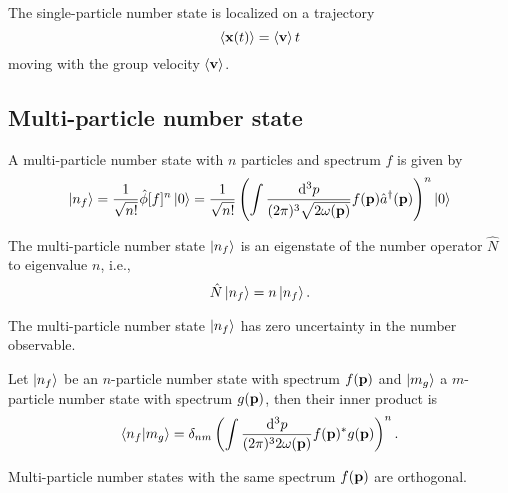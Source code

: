 \begin{lemma}
	The single-particle number state is localized on a trajectory
	\begin{equation}
		\expval{\vb{x}(t)}
		=
		\expval{\vb{v}}t
	\end{equation}
	moving with the group velocity $\expval{\vb{v}}$.
\end{lemma}

\subsection{Multi-particle number state}

\begin{definition}
	A multi-particle number state with $n$ particles and spectrum $f$ is given by
	\begin{equation}
		\ket{n_f}
		=
		\frac{1}{\sqrt{n!}}
		\hat\phi[f]^n
		\ket{0}
		=
		\frac{1}{\sqrt{n!}}
		\left(
			\int\frac{\dd[3]{p}}{(2\pi)^3\sqrt{2\omega(\vb{p})}}
			f(\vb{p})
			\hat{a}^\dagger(\vb{p})
		\right)^n
		\ket{0}
	\end{equation}
\end{definition}
\begin{theorem}
	The multi-particle number state $\ket{n_f}$ is an eigenstate of the number operator $\hat{N}$ to eigenvalue $n$, i.e.,
	\begin{equation}
		\hat{N}
		\ket{n_f}
		=
		n
		\ket{n_f}
		.
	\end{equation}
\end{theorem}
\begin{corollary}
	The multi-particle number state $\ket{n_f}$ has zero uncertainty in the number observable.
\end{corollary}
\begin{theorem}\label{thm:multi_particle_number_state_inner_product}
	Let $\ket{n_f}$ be an $n$-particle number state with spectrum $f(\vb{p})$ and $\ket{m_g}$ a $m$-particle number state with spectrum $g(\vb{p})$, then their inner product is
	\begin{equation}
		\braket{n_f}{m_g}
		=
		\delta_{nm}
		\left(
			\int\frac{\dd[3]{p}}{(2\pi)^32\omega(\vb{p})}
			f(\vb{p})^*
			g(\vb{p})
		\right)^n
		.
	\end{equation}
\end{theorem}
\begin{corollary}
	Multi-particle number states with the same spectrum $f(\vb{p})$ are orthogonal.
\end{corollary}


